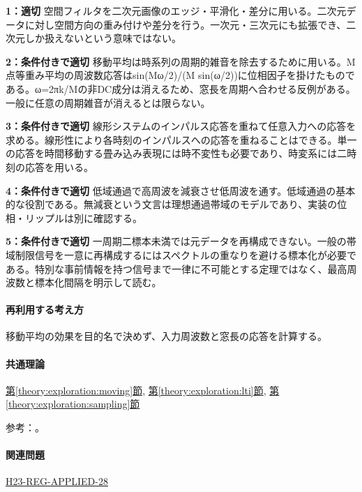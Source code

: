 \noindent\textbf{1：適切} 空間フィルタを二次元画像のエッジ・平滑化・差分に用いる。二次元データに対し空間方向の重み付けや差分を行う。一次元・三次元にも拡張でき、二次元しか扱えないという意味ではない。\par

\noindent\textbf{2：条件付きで適切} 移動平均は時系列の周期的雑音を除去するために用いる。M点等重み平均の周波数応答はsin(Mω/2)/(M sin(ω/2))に位相因子を掛けたものである。ω=2πk/Mの非DC成分は消えるため、窓長を周期へ合わせる反例がある。一般に任意の周期雑音が消えるとは限らない。\par

\noindent\textbf{3：条件付きで適切} 線形システムのインパルス応答を重ねて任意入力への応答を求める。線形性により各時刻のインパルスへの応答を重ねることはできる。単一の応答を時間移動する畳み込み表現には時不変性も必要であり、時変系には二時刻の応答を用いる。\par

\noindent\textbf{4：条件付きで適切} 低域通過で高周波を減衰させ低周波を通す。低域通過の基本的な役割である。無減衰という文言は理想通過帯域のモデルであり、実装の位相・リップルは別に確認する。\par

\noindent\textbf{5：条件付きで適切} 一周期二標本未満では元データを再構成できない。一般の帯域制限信号を一意に再構成するにはスペクトルの重なりを避ける標本化が必要である。特別な事前情報を持つ信号まで一律に不可能とする定理ではなく、最高周波数と標本化間隔を明示して読む。\par

\paragraph{再利用する考え方} 移動平均の効果を目的名で決めず、入力周波数と窓長の応答を計算する。

\paragraph{共通理論} \hyperref[theory:exploration:moving]{第\ref*{theory:exploration:moving}節}, \hyperref[theory:exploration:lti]{第\ref*{theory:exploration:lti}節}, \hyperref[theory:exploration:sampling]{第\ref*{theory:exploration:sampling}節}

\par 参考：\cite{mit_signals2010,mit_moving2012,scipy_notch,scipy_fft,usgs_processing2000}。

\paragraph{関連問題} \hyperref[q:h23-reg-applied-28]{H23-REG-APPLIED-28}

